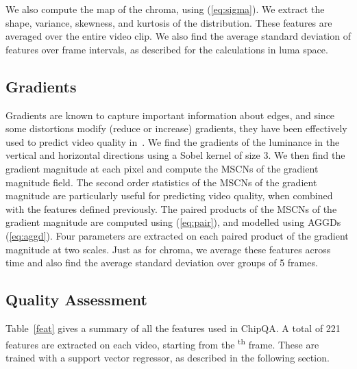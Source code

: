 \documentclass[journal]{IEEEtran}
\begin{document}
We also compute the  map of the chroma, using (\ref{eq:sigma}). We extract the shape, variance, skewness, and kurtosis of the distribution. These features are averaged over the entire video clip. We also find the average standard deviation of features over  frame intervals, as described for the  calculations in luma space.

\subsection{Gradients}

Gradients are known to capture important information about edges, and since some distortions modify (reduce or increase) gradients, they have been effectively used to predict video quality in~\cite{friquee,higrade,tlvqm,videval,rapique}. We find the gradients of the luminance in the vertical and horizontal directions using a Sobel kernel of size 3. We then find the gradient magnitude at each pixel and compute the MSCNs of the gradient magnitude field. The second order statistics of the MSCNs of the gradient magnitude are particularly useful for predicting video quality, when combined with the features defined previously. The paired products of the MSCNs of the gradient magnitude are computed using (\ref{eq:pair}), and modelled using AGGDs (\ref{eq:aggd}). Four parameters are extracted on each paired product of the gradient magnitude at two scales. Just as for chroma, we average these features across time and also find the average standard deviation over groups of 5 frames.


\subsection{Quality Assessment}
Table~\ref{feat} gives a summary of all the features used in ChipQA. A total of 221 features are extracted on each video, starting from the \textsuperscript{th} frame. These are trained with a support vector regressor, as described in the following section.
\end{document}
